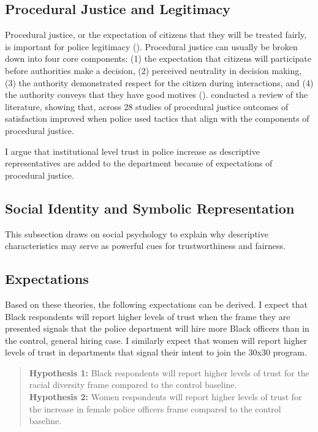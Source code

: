 \documentclass[12pt]{article}
\begin{document}
\subsection{Procedural Justice and Legitimacy}
Procedural justice, or the expectation of citizens that they will be treated fairly, is important for police legitimacy (\cite{hinds2007public, tyler2004enhancing}). Procedural justice can usually be broken down into four core components: (1) the expectation that citizens will participate before authorities make a decision, (2) perceived neutrality in decision making, (3) the authority demonstrated respect for the citizen during interactions, and (4) the authority conveys that they have good motives (\cite{goodman2010four,mazerolle2013procedural, tyler2002trust, tyler2011procedural}). \citet{mazerolle2013procedural} conducted a review of the literature, showing that, across 28 studies of procedural justice outcomes of satisfaction improved when police used tactics that align with the components of procedural justice. 

I argue that institutional level trust in police increase as descriptive representatives are added to the department because of expectations of procedural justice.

\subsection{Social Identity and Symbolic Representation}
This subsection draws on social psychology to explain why descriptive characteristics may serve as powerful cues for trustworthiness and fairness.

\subsection{Expectations}

Based on these theories, the following expectations can be derived. I expect that Black respondents will report higher levels of trust when the frame they are presented signals that the police department will hire more Black officers than in the control, general hiring case. I similarly expect that women will report higher levels of trust in departments that signal their intent to join the 30x30 program. 

\begin{quote}
    \textbf{Hypothesis 1:} Black respondents will report higher levels of trust for the racial diversity frame compared to the control baseline.\\
    \textbf{Hypothesis 2:} Women respondents will report higher levels of trust for the increase in female police officers frame compared to the control baseline.
\end{quote}
\end{document}
